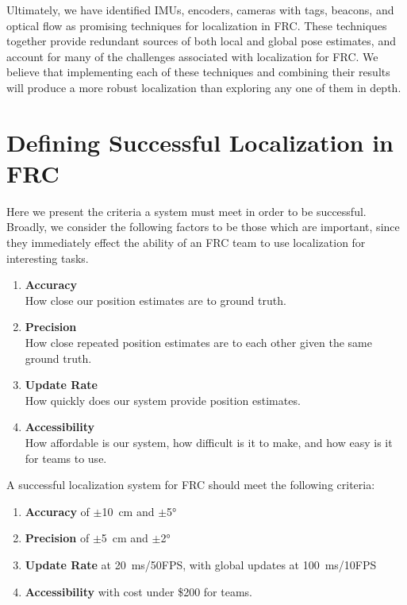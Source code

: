 \documentclass{article}
\begin{document}
    Ultimately, we have identified IMUs, encoders, cameras with tags, beacons, and optical flow as promising techniques for localization in FRC. These techniques together provide redundant sources of both local and global pose estimates, and account for many of the challenges associated with localization for FRC. We believe that implementing each of these techniques and combining their results will produce a more robust localization than exploring any one of them in depth.




\section{Defining Successful Localization in FRC} \label{section:defining_success}

  Here we present the criteria a system must meet in order to be successful. Broadly, we consider the following factors to be those which are important, since they immediately effect the ability of an FRC team to use localization for interesting tasks.

  \begin{enumerate}
    \item \textbf{Accuracy}\\ How close our position estimates are to ground truth.
    \item \textbf{Precision}\\ How close repeated position estimates are to each other given the same ground truth.
    \item \textbf{Update Rate}\\ How quickly does our system provide position estimates.
    \item \textbf{Accessibility}\\ How affordable is our system, how difficult is it to make, and how easy is it for teams to use.
  \end{enumerate}

  A successful localization system for FRC should meet the following criteria:

  \begin{enumerate}
    \item \textbf{Accuracy} of $\pm$\SI{10}{\centi\meter} and $\pm$\ang{5}
    \item \textbf{Precision} of $\pm$\SI{5}{\centi\meter} and $\pm$\ang{2}
    \item \textbf{Update Rate} at \SI{20}{\milli\second}/50FPS, with global updates at \SI{100}{\milli\second}/10FPS
    \item \textbf{Accessibility} with cost under \$200 for teams.
  \end{enumerate}
\end{document}
